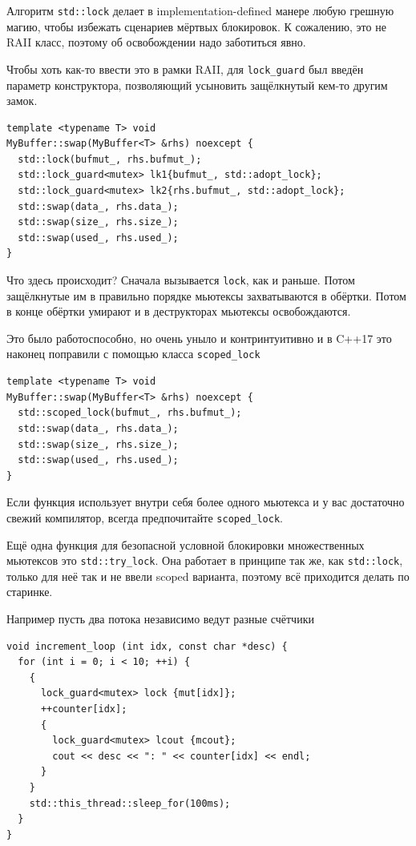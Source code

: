 \documentclass[a4paper,12pt,oneside]{book}
\begin{document}
Алгоритм \lstinline!std::lock! делает в implementation-defined манере любую грешную магию, чтобы избежать сценариев мёртвых блокировок. К сожалению, это не RAII класс, поэтому об освобождении надо заботиться явно.

Чтобы хоть как-то ввести это в рамки RAII, для \lstinline!lock_guard! был введён параметр конструктора, позволяющий усыновить защёлкнутый кем-то другим замок.

\begin{lstlisting}
template <typename T> void 
MyBuffer::swap(MyBuffer<T> &rhs) noexcept {
  std::lock(bufmut_, rhs.bufmut_);
  std::lock_guard<mutex> lk1{bufmut_, std::adopt_lock};
  std::lock_guard<mutex> lk2{rhs.bufmut_, std::adopt_lock};
  std::swap(data_, rhs.data_);
  std::swap(size_, rhs.size_);
  std::swap(used_, rhs.used_);
}
\end{lstlisting}

Что здесь происходит? Сначала вызывается \lstinline!lock!, как и раньше. Потом защёлкнутые им в правильно порядке мьютексы захватываются в обёртки. Потом в конце обёртки умирают и в деструкторах мьютексы освобождаются.

Это было работоспособно, но очень уныло и контринтуитивно и в C++17 это наконец поправили с помощью класса \lstinline!scoped_lock!

\begin{lstlisting}
template <typename T> void 
MyBuffer::swap(MyBuffer<T> &rhs) noexcept {
  std::scoped_lock(bufmut_, rhs.bufmut_);
  std::swap(data_, rhs.data_);
  std::swap(size_, rhs.size_);
  std::swap(used_, rhs.used_);
}
\end{lstlisting}

Если функция использует внутри себя более одного мьютекса и у вас достаточно свежий компилятор, всегда предпочитайте \lstinline!scoped_lock!.

Ещё одна функция для безопасной условной блокировки множественных мьютексов это \lstinline!std::try_lock!. Она работает в принципе так же, как \lstinline!std::lock!, только для неё так и не ввели scoped варианта, поэтому всё приходится делать по старинке.

Например пусть два потока независимо ведут разные счётчики

\begin{lstlisting}
void increment_loop (int idx, const char *desc) {
  for (int i = 0; i < 10; ++i) {
    {
      lock_guard<mutex> lock {mut[idx]};
      ++counter[idx];
      {
        lock_guard<mutex> lcout {mcout};
        cout << desc << ": " << counter[idx] << endl;
      }
    }
    std::this_thread::sleep_for(100ms);
  }
}
\end{lstlisting}
\end{document}
